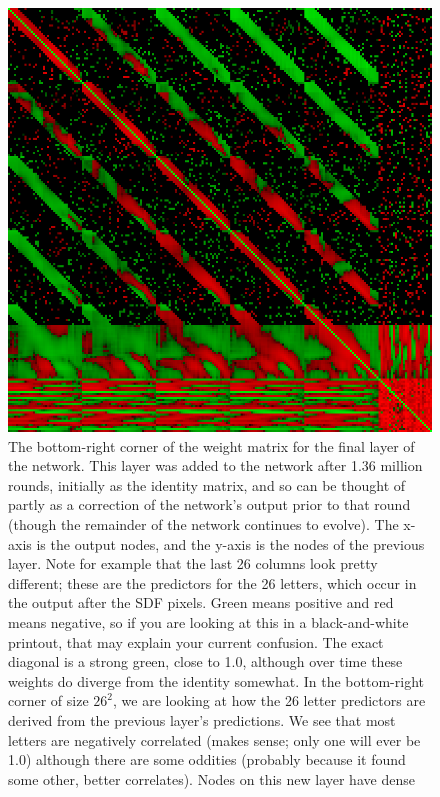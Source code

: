 \documentclass[twocolumn]{article}
\begin{document}
\begin{figure}[ht]
\centering
  \includegraphics[width=0.99 \linewidth]{lastlayer}
  \caption{ The bottom-right corner of the weight matrix for the final
    layer of the network. This layer was added to the network after
    1.36 million rounds, initially as the identity matrix, and so can
    be thought of partly as a correction of the network's output prior
    to that round (though the remainder of the network continues to
    evolve). The x-axis is the output nodes, and the y-axis is the
    nodes of the previous layer. Note for example that the last 26
    columns look pretty different; these are the predictors for the 26
    letters, which occur in the output after the SDF pixels. Green
    means positive and red means negative, so if you are looking at
    this in a black-and-white printout, that may explain your current
    confusion. The exact diagonal is a strong green, close to 1.0,
    although over time these weights do diverge from the identity
    somewhat. In the bottom-right corner of size $26^2$, we are
    looking at how the 26 letter predictors are derived from the
    previous layer's predictions. We see that most letters are
    negatively correlated (makes sense; only one will ever be 1.0)
    although there are some oddities (probably because it found some
    other, better correlates). Nodes on this new layer have dense
}
\end{figure}
\end{document}
